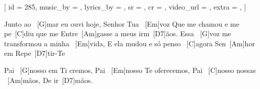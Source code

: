 [
    id          = {285},
    music_by    = {},
    lyrics_by   = {},
    sr          = {},
    cr          = {},
    video_url   = {},
    extra       = {},
]

\beginverse
Junto ao \ [G]mar eu ouvi hoje, Senhor Tua \ [Em]voz
Que me chamou e me pe\ [C]diu que me
Entre\ [Am]gasse a meus irm\ [D7]ãos.
Essa \ [G]voz me transformou a minha \ [Em]vida,
E ela mudou e só penso \ [C]agora Sen\ [Am]hor em
Repe\ [D7]tir-Te
\endverse

\beginchorus
Pai \ [G]nosso em Ti cremos,
Pai \ [Em]nosso Te oferecemos,
Pai \ [C]nosso nossas \ [Am]mãos,
De ir\ [D7]mãos.
\endchorus

\endsong
